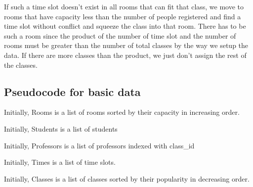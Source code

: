 \documentclass[11pt, oneside]{article}   	%
\begin{document}
If such a time slot doesn't exist in all rooms that can fit that class, we move to rooms that have capacity less than the number of people registered and find a time slot without conflict and squeeze the class into that room. There has to be such a room since the product of the number of time slot and the number of rooms must be greater than the number of total classes by the way we setup the data. If there are more classes than the product, we just don't assign the rest of the classes.

\subsection{Pseudocode for basic data}
\begin{algorithm}[H]
    Initially, Rooms is a list of rooms sorted by their capacity in increasing order.
    
    Initially, Students is a list of students
    
    Initially, Professors is a list of professors indexed with class\_id
    
    Initially, Times is a list of time slots.
    
    Initially, Classes is a list of classes sorted by their popularity in decreasing order.
    
\end{algorithm}
\end{document}
